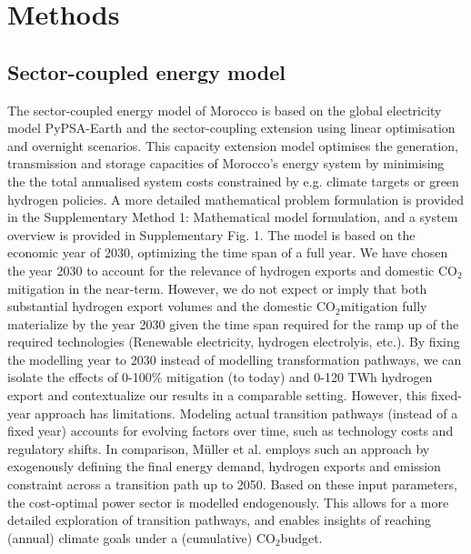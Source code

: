 \documentclass[5p,numafflabel]{elsarticle}
\newcommand{\co}{\ce{CO2}~}
\def\co{CO${}_2${\:}}
\begin{document}
\section*{Methods}
\label{sec:methods}

\subsection*{Sector-coupled energy model}
\label{subsec:moroccan_model}
The sector-coupled energy model of Morocco is based on the global electricity model  PyPSA-Earth \cite{Parzen2023} and the sector-coupling extension \cite{Abdel-Khalek2025} using linear optimisation and overnight scenarios. This capacity extension model optimises the generation, transmission and storage capacities of Morocco's energy system by minimising the the total annualised system costs constrained by e.g. climate targets or green hydrogen policies.
A more detailed mathematical problem formulation is provided in the Supplementary Method 1: Mathematical model formulation,
and a system overview is provided in Supplementary Fig. 1. %
The model is based on the economic year of 2030, optimizing the time span of a full year. We have chosen the year 2030 to account for the relevance of hydrogen exports and domestic \co mitigation in the near-term. However, we do not expect or imply that both substantial hydrogen export volumes and the domestic \co mitigation fully materialize by the year 2030 given the time span required for the ramp up of the required technologies (Renewable electricity, hydrogen electrolyis, etc.). By fixing the modelling year to 2030 instead of modelling transformation pathways, we can isolate the effects of 0-100\% mitigation (to today) and 0-120 TWh hydrogen export and contextualize our results in a comparable setting.
However, this fixed-year approach has limitations. Modeling actual transition pathways (instead of a fixed year) accounts for evolving factors over time, such as technology costs and regulatory shifts. 
In comparison, M\"uller et al.\cite{Muller2024} employs such an  approach by exogenously defining the final energy demand, hydrogen exports and emission constraint across a transition path up to 2050. Based on these input parameters, the cost-optimal power sector is modelled endogenously. This allows for a more detailed exploration of transition pathways, and enables insights of reaching (annual) climate goals under a (cumulative) \co budget.
\end{document}
